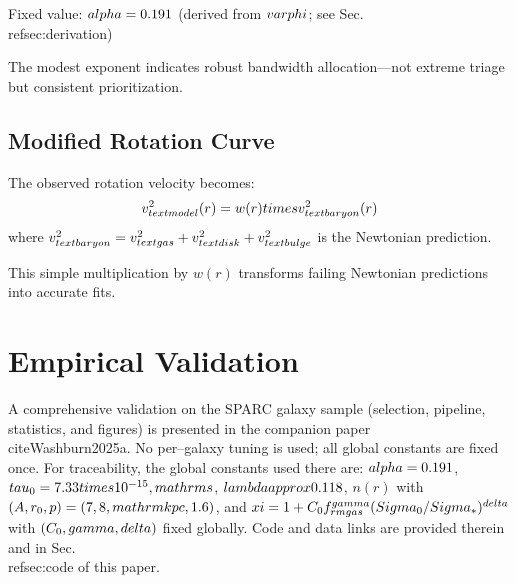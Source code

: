 \documentclass[twocolumn,prd,amsmath,amssymb,aps,superscriptaddress,nofootinbib]{revtex4-2}
\begin{document}
Fixed value: $\\alpha = 0.191$ (derived from $\\varphi$; see Sec.~\\ref{sec:derivation})

The modest exponent indicates robust bandwidth allocation---not extreme triage but consistent prioritization.

\subsection{Modified Rotation Curve}

The observed rotation velocity becomes:
\begin{equation}
v_{\\text{model}}^2(r) = w(r) \\times v_{\\text{baryon}}^2(r)
\end{equation}
where $v_{\\text{baryon}}^2 = v_{\\text{gas}}^2 + v_{\\text{disk}}^2 + v_{\\text{bulge}}^2$ is the Newtonian prediction.

This simple multiplication by $w(r)$ transforms failing Newtonian predictions into accurate fits.

\section{Empirical Validation}

A comprehensive validation on the SPARC galaxy sample (selection, pipeline, statistics, and figures) is presented in the companion paper \\cite{Washburn2025a}. No per--galaxy tuning is used; all global constants are fixed once. For traceability, the global constants used there are: $\\alpha=0.191$, $\\tau_0=7.33\\times10^{-15}\\,\\mathrm{s}$, $\\lambda \\approx 0.118$, $n(r)$ with $(A, r_0, p)=(7,8\\,\\mathrm{kpc},1.6)$, and $\\xi=1 + C_0 f_{\\rm gas}^{\\gamma}(\\Sigma_0/\\Sigma_*)^{\\delta}$ with $(C_0,\\gamma,\\delta)$ fixed globally. Code and data links are provided therein and in Sec.~\\ref{sec:code} of this paper.
\end{document}
